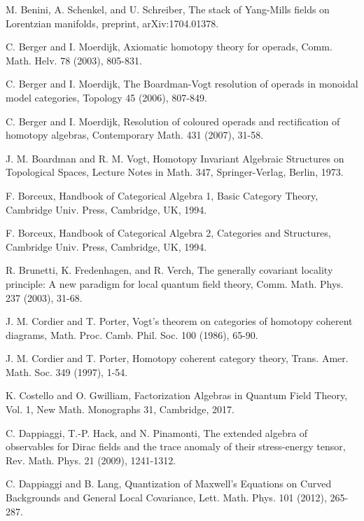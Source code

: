 \documentclass[11pt]{amsbook}
\numberwithin{section}{chapter}
\numberwithin{subsection}{section}
\numberwithin{equation}{section}
\theoremstyle{plain}
\theoremstyle{definition}
\begin{document}
\begin{thebibliography}{AAAAAA}
M. Benini, A. Schenkel, and U. Schreiber, The stack of Yang-Mills fields on Lorentzian manifolds, preprint, arXiv:1704.01378.

C. Berger and I. Moerdijk, Axiomatic homotopy theory for operads, Comm. Math. Helv. 78 (2003), 805-831.

C. Berger and I. Moerdijk, The Boardman-Vogt resolution of operads in monoidal model categories, Topology 45 (2006), 807-849. 

C. Berger and I. Moerdijk, Resolution of coloured operads and rectification of homotopy algebras, Contemporary Math. 431 (2007), 31-58.

J. M. Boardman and R. M. Vogt, Homotopy Invariant Algebraic Structures on Topological Spaces, Lecture Notes in Math. 347, Springer-Verlag, Berlin, 1973.

F. Borceux, Handbook of Categorical Algebra 1, Basic Category Theory, Cambridge Univ. Press, Cambridge, UK, 1994.

F. Borceux, Handbook of Categorical Algebra 2, Categories and Structures, Cambridge Univ. Press, Cambridge, UK, 1994.

R. Brunetti, K. Fredenhagen, and R. Verch, The generally covariant locality principle: A new paradigm for local quantum field theory, Comm. Math. Phys. 237 (2003), 31-68.

J. M. Cordier and T. Porter, Vogt's theorem on categories of homotopy coherent diagrams, Math. Proc. Camb. Phil. Soc. 100 (1986), 65-90.

J. M. Cordier and T. Porter, Homotopy coherent category theory, Trans. Amer. Math. Soc. 349 (1997), 1-54.

K. Costello and O. Gwilliam, Factorization Algebras in Quantum Field Theory, Vol. 1, New Math. Monographs 31, Cambridge, 2017.

C. Dappiaggi, T.-P. Hack, and N. Pinamonti, The extended algebra of observables for Dirac fields and the trace anomaly of their stress-energy tensor, Rev. Math. Phys. 21 (2009), 1241-1312.

C. Dappiaggi and B. Lang, Quantization of Maxwell’s Equations on Curved Backgrounds and General Local Covariance, Lett. Math. Phys. 101 (2012), 265-287.


\end{thebibliography}
\end{document}
